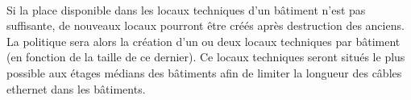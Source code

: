 \paragraph{} Si la place disponible dans les locaux techniques d'un bâtiment n'est pas suffisante, de nouveaux locaux pourront être créés après destruction des anciens. La politique sera alors la création d'un ou deux locaux techniques par bâtiment (en fonction de la taille de ce dernier). Ce locaux techniques seront situés le plus possible aux étages médians des bâtiments afin de limiter la longueur des câbles ethernet dans les bâtiments. 